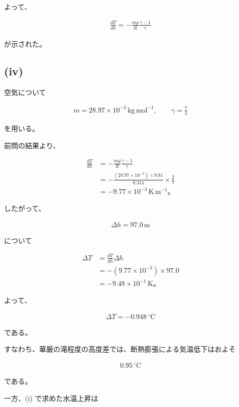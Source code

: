 \documentclass[platex,dvipdfmx,a4paper]{jsarticle}
\begin{document}
よって、

\begin{align*}
\frac{dT}{dh}
=
-\frac{mg}{R}
\frac{\gamma-1}{\gamma}
\end{align*}

が示された。

\subsection{(iv)}

空気について

\begin{align*}
m
=
28.97\times10^{-3}
\,\mathrm{kg\,mol^{-1}},
\qquad
\gamma=\frac75
\end{align*}

を用いる。

前問の結果より、

\begin{align*}
\frac{dT}{dh}
&=
-\frac{mg}{R}
\frac{\gamma-1}{\gamma}
\\
&=
-\frac{
(28.97\times10^{-3})
\times
9.81
}{
8.314
}
\times
\frac{2}{7}
\\
&=
-9.77\times10^{-3}
\,\mathrm{K\,m^{-1}}。
\end{align*}

したがって、

\begin{align*}
\Delta h
=
97.0\,\mathrm{m}
\end{align*}

について

\begin{align*}
\Delta T
&=
\frac{dT}{dh}\Delta h
\\
&=
-(9.77\times10^{-3})
\times97.0
\\
&=
-9.48\times10^{-1}
\,\mathrm{K}。
\end{align*}

よって、

\begin{align*}
\Delta T
=
-0.948\,^\circ\mathrm{C}
\end{align*}

である。

すなわち、華厳の滝程度の高度差では、断熱膨張による気温低下はおよそ

\begin{align*}
0.95\,^\circ\mathrm{C}
\end{align*}

である。

一方、(i) で求めた水温上昇は
\end{document}
